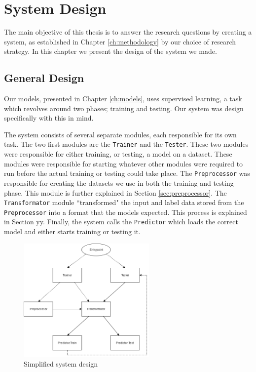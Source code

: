 
\chapter{System Design}
\label{ch:system_design}
The main objective of this thesis is to answer the research questions by creating a system, as established in Chapter \ref{ch:methodology} by our choice of research strategy. In this chapter we present the design of the system we made. 


\section{General Design}
Our models, presented in Chapter \ref{ch:models}, uses supervised learning, a task which revolves around two phases; training and testing. Our system was design specifically with this in mind.

The system consists of several separate modules, each responsible for its own task. The two first modules are the {\tt Trainer} and the {\tt Tester}. These two modules were responsible for either training, or testing, a model on a dataset. These modules were responsible for starting whatever other modules were required to run before the actual training or testing could take place. The {\tt Preprocessor} was responsible for creating the datasets we use in both the training and testing phase. This module is further explained in Section \ref{sec:preprocessor}. The {\tt Transformator} module ``transformed" the input and label data stored from the {\tt Preprocessor} into a format that the models expected. This process is explained in Section yy. Finally, the system calls the {\tt Predictor} which loads the correct model and either starts training or testing it.

\begin{figure}[ht]
    \centering
    \includegraphics[width=0.6\textwidth]{fig/system_design/system_design.png}
    \caption{Simplified system design}
    \label{fig:system-design}
\end{figure}

